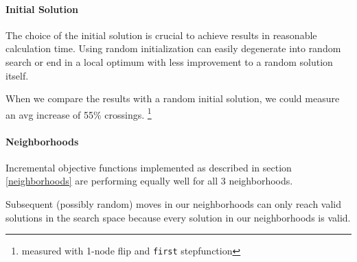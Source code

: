 \documentclass{scrartcl}
\begin{document}
\paragraph{Initial Solution}
The choice of the initial solution is crucial to achieve results in reasonable calculation time.
Using random initialization can easily degenerate into random search or end in a 
local optimum with less improvement to a random solution itself.



When we compare the results with a random initial solution, we could
measure an avg increase of 55\% crossings.
\footnote{measured with 1-node flip and \texttt{first} stepfunction}
%

%




\paragraph{Neighborhoods}
Incremental objective functions implemented as described in section \ref{neighborhoods}
are performing equally well for all 3 neighborhoods.

Subsequent (possibly random) moves in our neighborhoods can only reach
valid solutions in the search space because every solution in our neighborhoods
is valid.
\end{document}
